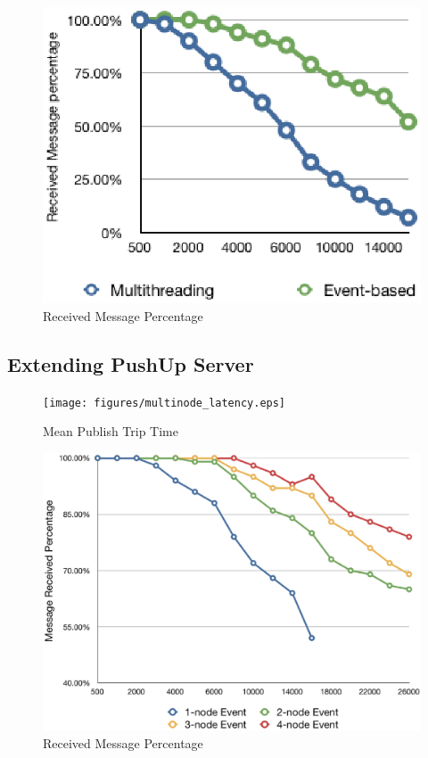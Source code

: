 \begin{figure}[htb!]
\centering%
    \includegraphics[scale=0.70]{figures/et_rate.eps}
    \caption{Received Message Percentage}
    \label{fig:et_rate}
\end{figure}


\subsection{Extending PushUp Server\\}

\begin{figure}[htb!]
\centering%
    \texttt{[image: figures/multinode\_latency.eps]}
    \caption{Mean Publish Trip Time}
    \label{fig:mt_latency}
\end{figure}

\begin{figure}[htb!]
\centering%
    \includegraphics[scale=0.30]{figures/multinode_rate.eps}
    \caption{Received Message Percentage}
    \label{fig:mt_rate}
\end{figure}


